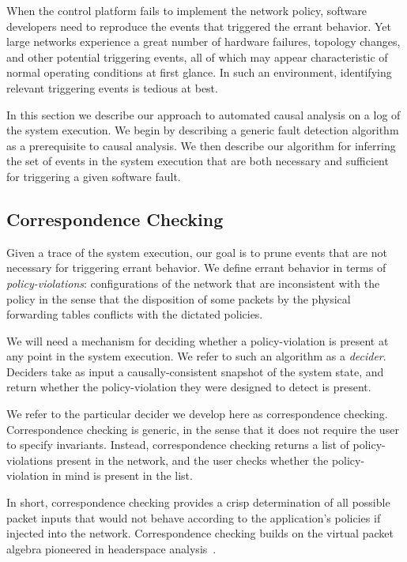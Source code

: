 When the control platform fails to implement the network policy, software
developers need to reproduce the events that triggered the errant behavior.
Yet large networks experience a great number of hardware failures, topology changes,
and other potential triggering events,
all of which may appear characteristic of normal operating
conditions at first glance. In such an environment, identifying relevant
triggering events is tedious at best.

In this section we describe our approach to automated causal
analysis on a log of the system execution. We begin by describing a
generic fault detection algorithm as a prerequisite to causal analysis.
We then describe our algorithm for inferring the set of events in the system
execution that are both necessary and sufficient for triggering a given software
fault.

\subsection{Correspondence Checking}

Given a trace of the system execution, our goal is to prune events that are not necessary for triggering
errant behavior. We define errant behavior in terms of {\em policy-violations}: 
configurations of the network that are inconsistent
with the policy in the sense that the disposition of some packets by the
physical forwarding tables conflicts with the dictated policies.

We will need a mechanism for deciding
whether a policy-violation is present at any point in the system execution.
We refer to such an algorithm as a {\em decider}. Deciders take as input a
causally-consistent snapshot of the system state, and return whether the
policy-violation they were designed to detect is present.

We refer to the particular decider we develop here as correspondence checking.
Correspondence checking is generic, in the sense that it does not require
the user to specify invariants. Instead, correspondence checking returns a list
of policy-violations present in the network, and the user checks whether the
policy-violation in mind is present in the list.

In short, correspondence checking provides a crisp determination of all possible packet inputs that
would not behave according to the application's policies if injected into the
network. Correspondence checking builds on the virtual packet algebra pioneered in headerspace
analysis~\cite{hsa}. 

